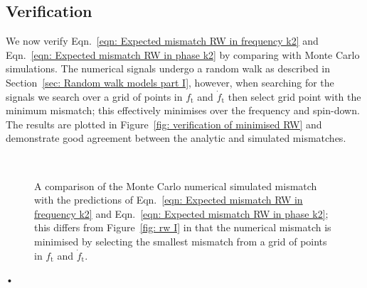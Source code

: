\subsection{Verification}

We now verify Eqn.~\eqref{eqn: Expected mismatch RW in frequency k2} and
Eqn.~\eqref{eqn: Expected mismatch RW in phase k2} by comparing with Monte
Carlo simulations. The numerical signals undergo a random walk as described in
Section~\ref{sec: Random walk models part I}, however, when searching for the
signals we search over a grid of points in $f_\textrm{t}$ and $\dot{f}_\textrm{t}$ then select grid point
with the minimum mismatch; this effectively minimises over the frequency and
spin-down. The results are plotted in Figure~\ref{fig: verification of
minimised RW} and demonstrate good agreement between the analytic and simulated
mismatches.

\begin{figure}[ht]
\centering
{}
\\
\caption{A comparison of the Monte Carlo numerical simulated mismatch with the
predictions of Eqn.~\eqref{eqn: Expected mismatch RW in
frequency k2} and Eqn.~\eqref{eqn: Expected mismatch RW in phase k2}; this differs
from Figure~\ref{fig: rw I} in that the numerical mismatch is minimised by selecting
the smallest mismatch from a grid of points in $f_\textrm{t}$ and $\dot{f}_\textrm{t}$.}
\label{fig: verification of minimised RW}
\end{figure}•
\FloatBarrier
